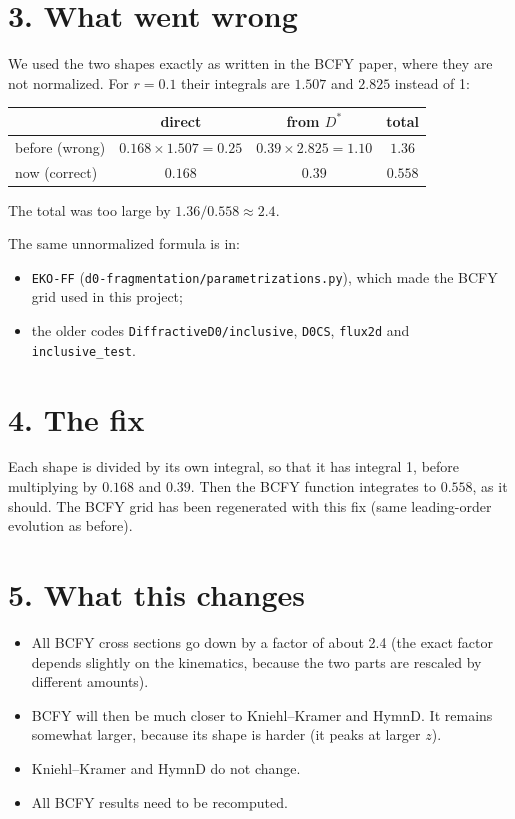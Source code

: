 \documentclass[12pt]{article}
\begin{document}
\section*{3. What went wrong}

We used the two shapes exactly as written in the BCFY paper, where they are not normalized. For
$r=0.1$ their integrals are $1.507$ and $2.825$ instead of 1:
\begin{center}
\begin{tabular}{lccc}
\toprule
 & direct & from $D^*$ & total \\
\midrule
before (wrong)  & $0.168\times1.507=0.25$ & $0.39\times2.825=1.10$ & $1.36$ \\
now (correct)   & $0.168$ & $0.39$ & $0.558$ \\
\bottomrule
\end{tabular}
\end{center}
The total was too large by $1.36/0.558\approx2.4$.

The same unnormalized formula is in:
\begin{itemize}
\item \texttt{EKO-FF} (\texttt{d0-fragmentation/parametrizations.py}), which made the BCFY grid used
  in this project;
\item the older codes \texttt{DiffractiveD0/inclusive}, \texttt{D0CS}, \texttt{flux2d} and
  \texttt{inclusive\_test}.
\end{itemize}

\section*{4. The fix}

Each shape is divided by its own integral, so that it has integral 1, before multiplying by $0.168$
and $0.39$. Then the BCFY function integrates to $0.558$, as it should. The BCFY grid has been
regenerated with this fix (same leading-order evolution as before).

\section*{5. What this changes}

\begin{itemize}
\item All BCFY cross sections go down by a factor of about 2.4 (the exact factor depends slightly on
  the kinematics, because the two parts are rescaled by different amounts).
\item BCFY will then be much closer to Kniehl--Kramer and HymnD. It remains somewhat larger, because
  its shape is harder (it peaks at larger $z$).
\item Kniehl--Kramer and HymnD do not change.
\item All BCFY results need to be recomputed.
\end{itemize}
\end{document}
